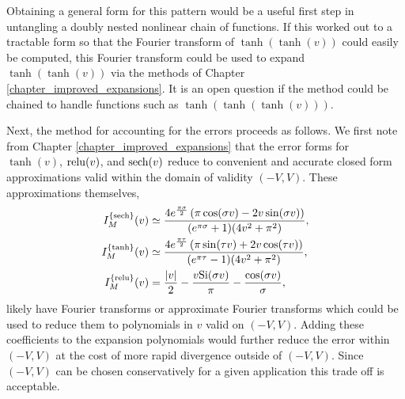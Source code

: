 Obtaining a general form for this pattern would be a useful first step in untangling a doubly nested nonlinear chain of functions.  If this worked out to a tractable form so that the Fourier transform of $\tanh(\tanh(v))$ could easily be computed, this Fourier transform could be used to expand $\tanh(\tanh(v))$ via the methods of Chapter \ref{chapter_improved_expansions}.  It is an open question if the method could be chained to handle functions such as $\tanh(\tanh(\tanh(v)))$.

Next, the method for accounting for the errors proceeds as follows.  We first note from Chapter \ref{chapter_improved_expansions} that the error forms for $\tanh(v)$, $\operatorname{relu}(v)$, and $\operatorname{sech}(v)$ reduce to convenient and accurate closed form approximations valid within the domain of validity $(-V, V)$.  These approximations themselves,
\begin{align}
	I_M^{\{\operatorname{sech}\}}(v) &\simeq
	\frac{
		4 e^{\frac{\pi \sigma}{2}}
		\left(\pi \cos(\sigma v) - 2 v \sin(\sigma v)\right)
	}{(e^{\pi \sigma} + 1)(4v^2 + \pi^2)}, \\
	I_M^{\{\tanh\}}(v) &\simeq
	\frac{
		4 e^{\frac{\pi \tau}{2}}
		\left(\pi \sin(\tau v) + 2 v \cos(\tau v)\right)
	}{(e^{\pi \tau} - 1)(4v^2 + \pi^2)}, \\
	I_M^{\{\operatorname{relu}\}}(v) &= \frac{|v|}{2} - \frac{v \mathrm{Si}(\sigma v)}{\pi}
    - \frac{\cos(\sigma v)}{\sigma},
\end{align}
likely have Fourier transforms or approximate Fourier transforms which could be used to reduce them to polynomials in $v$ valid on $(-V, V)$.  Adding these coefficients to the expansion polynomials would
further reduce the error within $(-V, V)$ at the cost of more rapid divergence outside of $(-V, V)$.  Since
$(-V, V)$ can be chosen conservatively for a given application this trade off is acceptable.

